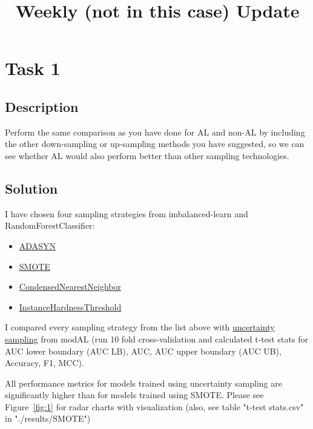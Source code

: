 \documentclass[a4paper,10pt]{article}
\title{Weekly (not in this case) Update}
\begin{document}
\maketitle

\tableofcontents

\medskip


\section{Task 1}
\subsection{Description}
Perform the same comparison as you have done for AL and non-AL by including the other down-sampling or up-sampling methods you have suggested, so we can see whether AL would also perform better than other sampling technologies.

\subsection{Solution}
I have chosen four sampling strategies from imbalanced-learn and RandomForestClassifier:
\begin{itemize}
    \item \href{https://imbalanced-learn.readthedocs.io/en/stable/generated/imblearn.over_sampling.ADASYN.html}{ADASYN}
    \item \href{https://imbalanced-learn.readthedocs.io/en/stable/generated/imblearn.over_sampling.SMOTE.html}{SMOTE}
    \item \href{https://imbalanced-learn.readthedocs.io/en/stable/generated/imblearn.under_sampling.CondensedNearestNeighbour.html}{CondensedNearestNeighbor}
    \item \href{https://imbalanced-learn.readthedocs.io/en/stable/generated/imblearn.under_sampling.InstanceHardnessThreshold.html}{InstanceHardnessThreshold}
\end{itemize}

I compared every sampling strategy from the list above with \href{https://modal-python.readthedocs.io/en/latest/content/apireference/uncertainty.html}{uncertainty sampling} from modAL (run 10 fold cross-validation and calculated t-test stats for AUC lower boundary (AUC LB), AUC, AUC upper boundary (AUC UB), Accuracy, F1, MCC). 

All performance metrics for models trained using uncertainty sampling are significantly higher than for models trained using SMOTE. Please see Figure~\ref{fig:1} for radar charts with visualization (also, see table "t-test stats.csv" in "./results/SMOTE")
\end{document}

